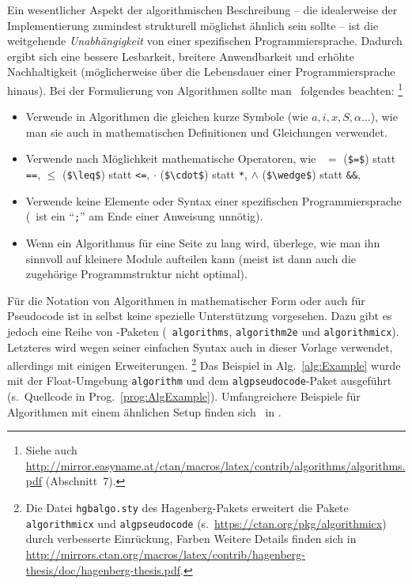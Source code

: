 Ein wesentlicher Aspekt der algorithmischen Beschreibung -- die idealerweise der Implementierung 
zumindest strukturell möglichst ähnlich sein sollte -- ist die weitgehende
\emph{Unabhängigkeit} von einer spezifischen Programmiersprache.
Dadurch ergibt sich eine bessere Lesbarkeit, breitere Anwendbarkeit und erhöhte Nachhaltigkeit
(möglicherweise über die Lebensdauer einer Programmiersprache hinaus).
Bei der Formulierung von Algorithmen sollte man \ua\ folgendes beachten:%
\footnote{Siehe auch \url{http://mirror.easyname.at/ctan/macros/latex/contrib/algorithms/algorithms.pdf}
(Abschnitt~7).}
\begin{itemize}
\item
Verwende in Algorithmen die gleichen kurze Symbole (wie $a, i, x, S, \alpha \ldots$), wie man sie auch in mathematischen Definitionen und Gleichungen verwendet.
\item
Verwende nach Möglichkeit mathematische Operatoren, wie \zB\
$=$	 (\verb!$=$!) statt \texttt{==},
$\leq$ (\verb!$\leq$!) statt \texttt{<=},
$\cdot$ (\verb!$\cdot$!) statt \texttt{*},
$\wedge$ (\verb!$\wedge$!) statt \texttt{\&\&},
\usw
\item
Verwende keine Elemente oder Syntax einer spezifischen Programmiersprache
(\zB\ ist ein "`\texttt{;}"' am Ende einer Anweisung unnötig).
\item
Wenn ein Algorithmus für eine Seite zu lang wird, überlege, wie man ihn
sinnvoll auf kleinere Module aufteilen kann (meist ist dann auch die zugehörige
Programmstruktur nicht optimal).
\end{itemize}


Für die Notation von Algorithmen in mathematischer Form oder auch für
Pseudo\-code ist in \latex selbst keine spezielle Unterstützung vorgesehen.
Dazu gibt es jedoch eine Reihe von \latex-Paketen (\zB\ \texttt{algorithms}, 
\texttt{algorithm2e} und \texttt{algorithmicx}).
Letzteres wird wegen seiner einfachen Syntax auch in dieser Vorlage verwendet, 
allerdings mit einigen Erweiterungen.%
\footnote{Die Datei \nolinkurl{hgbalgo.sty} des Hagenberg-Pakets erweitert die Pakete
\texttt{algorithmicx} und \texttt{algpseudocode} (s.\ \url{https://ctan.org/pkg/algorithmicx})
durch verbesserte Einrückung, Farben \etc  Weitere Details finden sich in 
\url{http://mirrors.ctan.org/macros/latex/contrib/hagenberg-thesis/doc/hagenberg-thesis.pdf}.}
Das Beispiel in Alg.~\ref{alg:Example} wurde mit der Float-Umgebung \texttt{algorithm} 
und dem \texttt{algpseudocode}-Paket ausgeführt (s.\ Quellcode in Prog.\ \ref{prog:AlgExample}).
Umfangreichere Beispiele für Algorithmen mit einem ähnlichen Setup finden sich \zB\ in 
\cite{BurgerBurge2015}.


